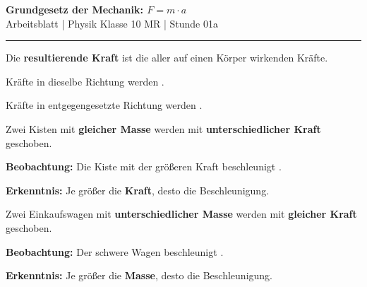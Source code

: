 \documentclass[11pt, a4paper]{article}
\newcommand{\fach}{Physik}
\newcommand{\thema}{Grundgesetz der Mechanik}
\newcommand{\klasse}{10 MR}
\newcommand{\stunde}{01a}
\newcommand{\luecke}[1]{\underline{\hspace{#1}}}
\begin{document}

\begin{center}
    {\Large\bfseries\textcolor{fachfarbe}{\thema: $F = m \cdot a$}}\\[0.2em]
    {\small Arbeitsblatt | \fach{} Klasse \klasse{} | Stunde \stunde}
\end{center}
\vspace{-0.3em}
\hrule
\vspace{0.6em}


\begin{merkkasten}[title={\textbf{Kasten 1: Resultierende Kraft}}]
Die \textbf{resultierende Kraft} ist die \luecke{3cm} aller auf einen Körper wirkenden Kräfte.

\vspace{0.3em}
Kräfte in dieselbe Richtung werden \luecke{2.5cm}.

Kräfte in entgegengesetzte Richtung werden \luecke{2.5cm}.
\end{merkkasten}


\begin{merkkasten}[title={\textbf{Kasten 2a: Erkenntnis – Kraft und Beschleunigung}}]
Zwei Kisten mit \textbf{gleicher Masse} werden mit \textbf{unterschiedlicher Kraft} geschoben.

\vspace{0.3em}
\textbf{Beobachtung:} Die Kiste mit der größeren Kraft beschleunigt \luecke{2.5cm}.

\vspace{0.3em}
\textbf{Erkenntnis:} Je größer die \textbf{Kraft}, desto \luecke{2.5cm} die Beschleunigung.
\end{merkkasten}


\begin{merkkasten}[title={\textbf{Kasten 2b: Erkenntnis – Masse und Beschleunigung}}]
Zwei Einkaufswagen mit \textbf{unterschiedlicher Masse} werden mit \textbf{gleicher Kraft} geschoben.

\vspace{0.3em}
\textbf{Beobachtung:} Der schwere Wagen beschleunigt \luecke{2.5cm}.

\vspace{0.3em}
\textbf{Erkenntnis:} Je größer die \textbf{Masse}, desto \luecke{2.5cm} die Beschleunigung.
\end{merkkasten}
\end{document}
